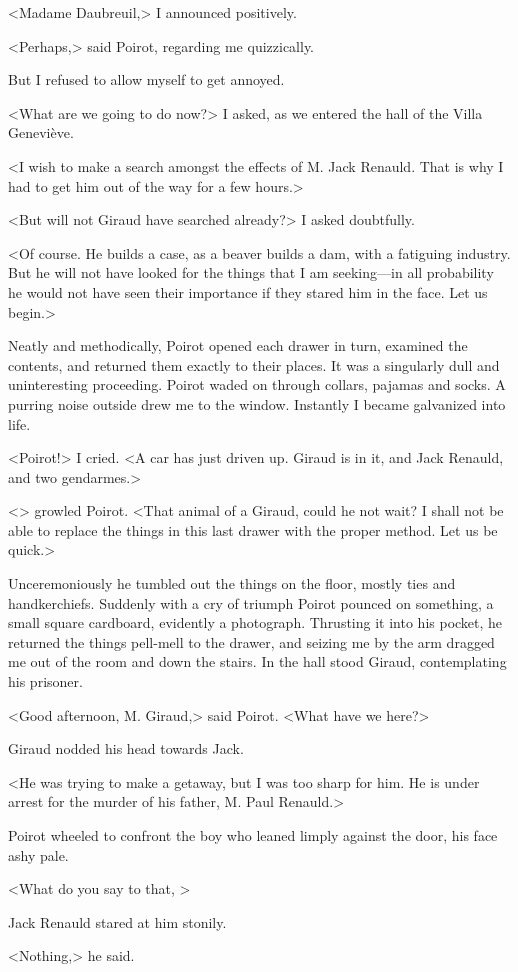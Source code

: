  <Madame Daubreuil,> I announced positively. 

 <Perhaps,> said Poirot, regarding me quizzically. 

 But I refused to allow myself to get annoyed. 

 <What are we going to do now?> I asked, as we entered the hall of the Villa Geneviève. 

 <I wish to make a search amongst the effects of M. Jack Renauld. That is why I had to get him out of the way for a few hours.> 

 <But will not Giraud have searched already?> I asked doubtfully. 

 <Of course. He builds a case, as a beaver builds a dam, with a fatiguing industry. But he will not have looked for the things that I am seeking—in all probability he would not have seen their importance if they stared him in the face. Let us begin.> 

 Neatly and methodically, Poirot opened each drawer in turn, examined the contents, and returned them exactly to their places. It was a singularly dull and uninteresting proceeding. Poirot waded on through collars, pajamas and socks. A purring noise outside drew me to the window. Instantly I became galvanized into life. 

 <Poirot!> I cried. <A car has just driven up. Giraud is in it, and Jack Renauld, and two gendarmes.> 

 <> growled Poirot. <That animal of a Giraud, could he not wait? I shall not be able to replace the things in this last drawer with the proper method. Let us be quick.> 

 Unceremoniously he tumbled out the things on the floor, mostly ties and handkerchiefs. Suddenly with a cry of triumph Poirot pounced on something, a small square cardboard, evidently a photograph. Thrusting it into his pocket, he returned the things pell-mell to the drawer, and seizing me by the arm dragged me out of the room and down the stairs. In the hall stood Giraud, contemplating his prisoner. 

 <Good afternoon, M. Giraud,> said Poirot. <What have we here?> 

 Giraud nodded his head towards Jack. 

 <He was trying to make a getaway, but I was too sharp for him. He is under arrest for the murder of his father, M. Paul Renauld.> 

 Poirot wheeled to confront the boy who leaned limply against the door, his face ashy pale. 

 <What do you say to that, > 

 Jack Renauld stared at him stonily. 

 <Nothing,> he said.